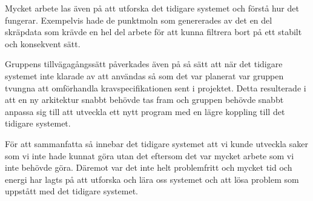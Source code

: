 Mycket arbete las även på att utforska det tidigare systemet och förstå hur det fungerar. Exempelvis hade de punktmoln som genererades av det en del skräpdata som krävde en hel del arbete för att kunna filtrera bort på ett stabilt och konsekvent sätt.

Gruppens tillvägagångssätt påverkades även på så sätt att när det tidigare systemet inte klarade av att användas så som det var planerat var gruppen tvungna att omförhandla kravspecifikationen sent i projektet. Detta resulterade i att en ny arkitektur snabbt behövde tas fram och gruppen behövde snabbt anpassa sig till att utveckla ett nytt program med en lägre koppling till det tidigare systemet.

För att sammanfatta så innebar det tidigare systemet att vi kunde utveckla saker som vi inte hade kunnat göra utan det eftersom det var mycket arbete som vi inte behövde göra. Däremot var det inte helt problemfritt och mycket tid och energi har lagts på att utforska och lära oss systemet och att lösa problem som uppstått med det tidigare systemet.



